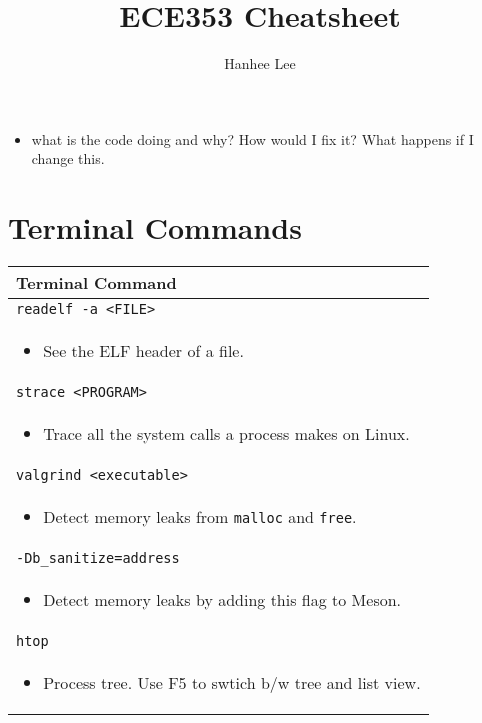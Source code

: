 \documentclass[twoside]{article}
\title{ECE353 Cheatsheet}
\author{Hanhee Lee}
\begin{document}
\begin{summary}
    \begin{itemize}
        \item what is the code doing and why? How would I fix it? What happens if I change this.
    \end{itemize}
\end{summary}

\section{Terminal Commands}
\begin{summary}
    \begin{center}
        \begin{tabular}{l}
        \toprule
        \textbf{Terminal Command} \\
        \midrule
        \texttt{readelf -a <FILE>} \\
        \multicolumn{1}{p{\linewidth}}{
        \begin{itemize}
            \item See the ELF header of a file.
        \end{itemize}} \\
        \midrule
        \texttt{strace <PROGRAM>} \\
        \multicolumn{1}{p{\linewidth}}{
        \begin{itemize}
            \item Trace all the system calls a process makes on Linux. 
        \end{itemize}} \\
        \midrule
        \texttt{valgrind <executable>} \\
        \multicolumn{1}{p{\linewidth}}{
        \begin{itemize}
            \item Detect memory leaks from \texttt{malloc} and \texttt{free}.
        \end{itemize}} \\
        \midrule
        \texttt{-Db\_sanitize=address} \\
        \multicolumn{1}{p{\linewidth}}{
        \begin{itemize}
            \item Detect memory leaks by adding this flag to Meson.
        \end{itemize}} \\
        \midrule
        \texttt{htop} \\
        \multicolumn{1}{p{\linewidth}}{
        \begin{itemize}
            \item Process tree. Use F5 to swtich b/w tree and list view.
        \end{itemize}} \\
        \bottomrule
        \end{tabular}
    \end{center}
\end{summary}
\newpage
\end{document}
